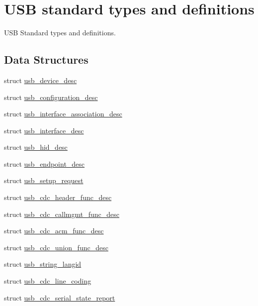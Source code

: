 \hypertarget{group___p_i_o_s___u_s_b___d_e_f_s}{\section{\-U\-S\-B standard types and definitions}
\label{group___p_i_o_s___u_s_b___d_e_f_s}
}


\-U\-S\-B \-Standard types and definitions.  


\subsection*{\-Data \-Structures}
\begin{DoxyCompactItemize}
\item 
struct \hyperlink{structusb__device__desc}{usb\-\_\-device\-\_\-desc}
\item 
struct \hyperlink{structusb__configuration__desc}{usb\-\_\-configuration\-\_\-desc}
\item 
struct \hyperlink{structusb__interface__association__desc}{usb\-\_\-interface\-\_\-association\-\_\-desc}
\item 
struct \hyperlink{structusb__interface__desc}{usb\-\_\-interface\-\_\-desc}
\item 
struct \hyperlink{structusb__hid__desc}{usb\-\_\-hid\-\_\-desc}
\item 
struct \hyperlink{structusb__endpoint__desc}{usb\-\_\-endpoint\-\_\-desc}
\item 
struct \hyperlink{structusb__setup__request}{usb\-\_\-setup\-\_\-request}
\item 
struct \hyperlink{structusb__cdc__header__func__desc}{usb\-\_\-cdc\-\_\-header\-\_\-func\-\_\-desc}
\item 
struct \hyperlink{structusb__cdc__callmgmt__func__desc}{usb\-\_\-cdc\-\_\-callmgmt\-\_\-func\-\_\-desc}
\item 
struct \hyperlink{structusb__cdc__acm__func__desc}{usb\-\_\-cdc\-\_\-acm\-\_\-func\-\_\-desc}
\item 
struct \hyperlink{structusb__cdc__union__func__desc}{usb\-\_\-cdc\-\_\-union\-\_\-func\-\_\-desc}
\item 
struct \hyperlink{structusb__string__langid}{usb\-\_\-string\-\_\-langid}
\item 
struct \hyperlink{structusb__cdc__line__coding}{usb\-\_\-cdc\-\_\-line\-\_\-coding}
\item 
struct \hyperlink{structusb__cdc__serial__state__report}{usb\-\_\-cdc\-\_\-serial\-\_\-state\-\_\-report}
\end{DoxyCompactItemize}
